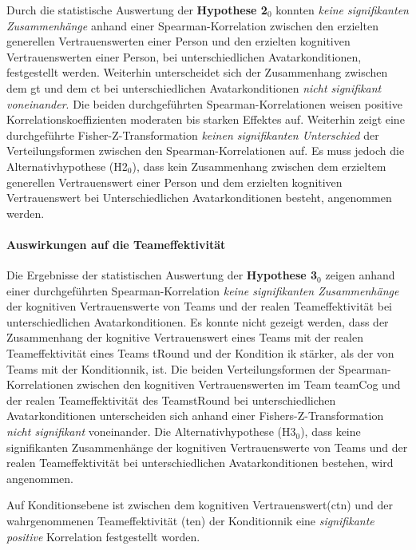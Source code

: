 \documentclass[a4paper,11pt]{article}%
\renewcommand{\\}{\vspace*{0.5\baselineskip} \newline}
\begin{document}
Durch die statistische Auswertung der \textbf{Hypothese 2$_{0}$} konnten \textit{keine signifikanten Zusammenhänge} anhand einer Spearman-Korrelation zwischen den erzielten generellen Vertrauenswerten einer Person und den erzielten kognitiven Vertrauenswerten einer Person, bei unterschiedlichen Avatarkonditionen, festgestellt werden. Weiterhin unterscheidet sich der Zusammenhang zwischen dem \ac{gt} und dem \ac{ct} bei unterschiedlichen Avatarkonditionen \textit{nicht signifikant voneinander}. \newline Die beiden durchgeführten Spearman-Korrelationen weisen positive Korrelationskoeffizienten moderaten bis starken Effektes auf. Weiterhin zeigt eine durchgeführte Fisher-Z-Transformation \textit{keinen signifikanten Unterschied} der Verteilungsformen zwischen den Spearman-Korrelationen auf. Es muss jedoch die Alternativhypothese (H2$_{0}$), dass kein Zusammenhang zwischen dem erzieltem generellen Vertrauenswert einer Person und dem erzielten kognitiven Vertrauenswert bei Unterschiedlichen Avatarkonditionen besteht, angenommen werden.

\paragraph{Auswirkungen auf die Teameffektivität}
Die Ergebnisse der statistischen Auswertung der \textbf{Hypothese 3$_{0}$} zeigen anhand einer durchgeführten Spearman-Korrelation \textit{keine signifikanten Zusammenhänge} der kognitiven Vertrauenswerte von Teams und der realen Teameffektivität bei unterschiedlichen Avatarkonditionen. Es konnte nicht gezeigt werden, dass der Zusammenhang der kognitive Vertrauenswert eines Teams mit der realen Teameffektivität eines Teams \ac{tRound} und der Kondition \ac{ik} stärker, als der von Teams mit der Kondition\newline \ac{nik}, ist.
Die beiden Verteilungsformen der Spearman-Korrelationen zwischen den kognitiven Vertrauenswerten im Team \ac{teamCog} und der realen Teameffektivität des Teams\newline \ac{tRound} bei unterschiedlichen Avatarkonditionen unterscheiden sich anhand einer Fishers-Z-Transformation \textit{nicht signifikant} voneinander.
Die Alternativhypothese  (H3$_{0}$), dass keine signifikanten Zusammenhänge der kognitiven Vertrauenswerte von Teams und der realen Teameffektivität bei unterschiedlichen Avatarkonditionen bestehen, wird angenommen. \newline

Auf Konditionsebene ist zwischen dem kognitiven Vertrauenswert\newline (\ac{ctn}) und der wahrgenommenen Teameffektivität (\ac{ten}) der Kondition\newline \ac{nik} eine \textit{signifikante positive} Korrelation festgestellt worden. 
\end{document}
